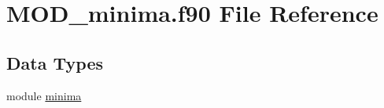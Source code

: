 \hypertarget{MOD__minima_8f90}{\section{M\-O\-D\-\_\-minima.\-f90 File Reference}
\label{MOD__minima_8f90}
}
\subsection*{Data Types}
\begin{DoxyCompactItemize}
\item 
module \hyperlink{classminima}{minima}
\end{DoxyCompactItemize}
